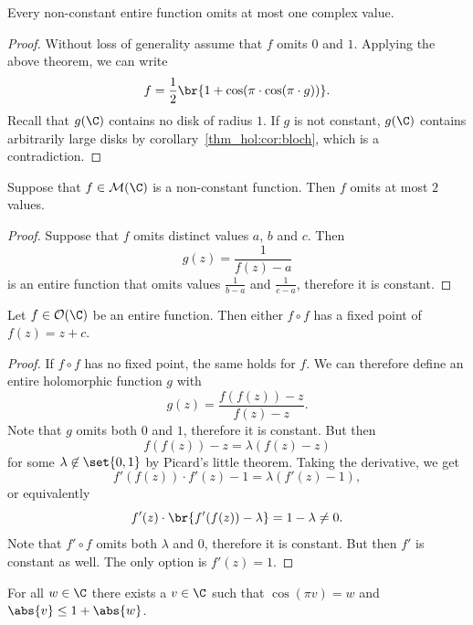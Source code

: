 \begin{izrek}
Every non-constant entire function omits at most one complex value.
\end{izrek}

\begin{proof}
Without loss of generality assume that $f$ omits $0$ and $1$.
Applying the above theorem, we can write
\[
f = \frac{1}{2} \br{1 + \cos(\pi \cdot \cos(\pi \cdot g))}.
\]
Recall that $g(\C)$ contains no disk of radius $1$. If $g$ is
not constant, $g(\C)$ contains arbitrarily large disks by
corollary~\ref{thm_hol:cor:bloch}, which is a contradiction.
\end{proof}

\begin{posledica}
Suppose that $f \in \mathcal{M}(\C)$ is a non-constant function.
Then $f$ omits at most $2$ values.
\end{posledica}

\begin{proof}
Suppose that $f$ omits distinct values $a$, $b$ and $c$. Then
\[
g(z) = \frac{1}{f(z) - a}
\]
is an entire function that omits values $\frac{1}{b-a}$ and
$\frac{1}{c-a}$, therefore it is constant.
\end{proof}

\begin{izrek}
Let $f \in \mathcal{O}(\C)$ be an entire function. Then either
$f \circ f$ has a fixed point of $f(z) = z + c$.
\end{izrek}

\begin{proof}
If $f \circ f$ has no fixed point, the same holds for $f$. We can
therefore define an entire holomorphic function $g$ with
\[
g(z) = \frac{f(f(z)) - z}{f(z) - z}.
\]
Note that $g$ omits both $0$ and $1$, therefore it is constant. But
then
\[
f(f(z)) - z = \lambda (f(z) - z)
\]
for some $\lambda \not \in \set{0, 1}$ by Picard's little theorem.
Taking the derivative, we get
\[
f'(f(z)) \cdot f'(z) - 1 = \lambda (f'(z) - 1),
\]
or equivalently
\[
f'(z) \cdot \br{f'(f(z)) - \lambda} = 1 - \lambda \ne 0.
\]
Note that $f' \circ f$ omits both $\lambda$ and $0$, therefore it
is constant. But then $f'$ is constant as well. The only option is
$f'(z) = 1$.
\end{proof}


\begin{lema}
For all $w \in \C$ there exists a $v \in \C$ such that
$\cos(\pi v) = w$ and $\abs{v} \leq 1 + \abs{w}$.
\end{lema}

